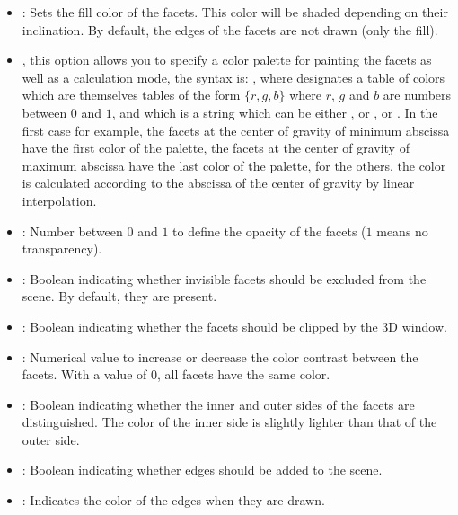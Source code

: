 \begin{itemize}
    \item {}: Sets the fill color of the facets. This color will be shaded depending on their inclination. By default, the edges of the facets are not drawn (only the fill).

     \item {}, this option allows you to specify a color palette for painting the facets as well as a calculation mode, the syntax is: , where  designates a table of colors which are themselves tables of the form $\{r,g,b\}$ where $r$, $g$ and $b$ are numbers between $0$ and $1$, and  which is a string which can be either , or , or . In the first case for example, the facets at the center of gravity of minimum abscissa have the first color of the palette, the facets at the center of gravity of maximum abscissa have the last color of the palette, for the others, the color is calculated according to the abscissa of the center of gravity by linear interpolation.

     \item {}: Number between $0$ and $1$ to define the opacity of the facets ($1$ means no transparency).

    \item {}: Boolean indicating whether invisible facets should be excluded from the scene. By default, they are present.

    \item {}: Boolean indicating whether the facets should be clipped by the 3D window.

    \item {}: Numerical value to increase or decrease the color contrast between the facets. With a value of $0$, all facets have the same color.

    \item {}: Boolean indicating whether the inner and outer sides of the facets are distinguished. The color of the inner side is slightly lighter than that of the outer side.

    \item {}: Boolean indicating whether edges should be added to the scene.

    \item {}: Indicates the color of the edges when they are drawn.


\end{itemize}
